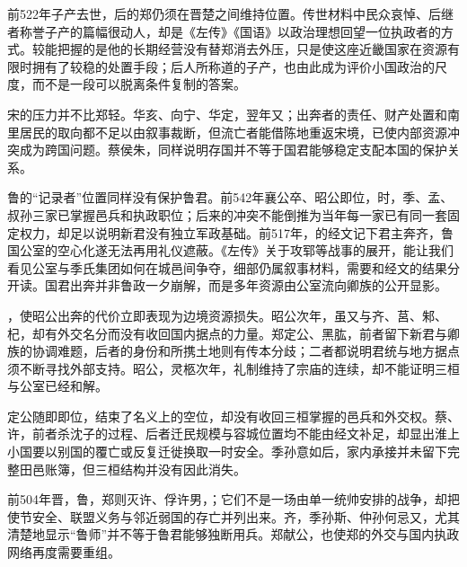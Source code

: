 前522年子产去世，后的郑仍须在晋楚之间维持位置。传世材料中民众哀悼、后继者称誉子产的篇幅很动人，却是《左传》《国语》以政治理想回望一位执政者的方式。较能把握的是他的长期经营没有替郑消去外压，只是使这座近畿国家在资源有限时拥有了较稳的处置手段；后人所称道的子产，也由此成为评价小国政治的尺度，而不是一段可以脱离条件复制的答案。

宋的压力并不比郑轻。华亥、向宁、华定，翌年又；出奔者的责任、财产处置和南里居民的取向都不足以由叙事裁断，但流亡者能借陈地重返宋境，已使内部资源冲突成为跨国问题。蔡侯朱，同样说明存国并不等于国君能够稳定支配本国的保护关系。

鲁的“记录者”位置同样没有保护鲁君。前542年襄公卒、昭公即位，时，季、孟、叔孙三家已掌握邑兵和执政职位；后来的冲突不能倒推为当年每一家已有同一套固定权力，却足以说明新君没有独立军政基础。前517年，的经文记下君主奔齐，鲁国公室的空心化遂无法再用礼仪遮蔽。《左传》关于攻郓等战事的展开，能让我们看见公室与季氏集团如何在城邑间争夺，细部仍属叙事材料，需要和经文的结果分开读。国君出奔并非鲁政一夕崩解，而是多年资源由公室流向卿族的公开显影。

，使昭公出奔的代价立即表现为边境资源损失。昭公次年，虽又与齐、莒、邾、杞，却有外交名分而没有收回国内据点的力量。郑定公、黑肱，前者留下新君与卿族的协调难题，后者的身份和所携土地则有传本分歧；二者都说明君统与地方据点须不断寻找外部支持。昭公，灵柩次年，礼制维持了宗庙的连续，却不能证明三桓与公室已经和解。

定公随即即位，结束了名义上的空位，却没有收回三桓掌握的邑兵和外交权。蔡、许，前者杀沈子的过程、后者迁民规模与容城位置均不能由经文补足，却显出淮上小国要以别国的覆亡或反复迁徙换取一时安全。季孙意如后，家内承接并未留下完整田邑账簿，但三桓结构并没有因此消失。

前504年晋，鲁，郑则灭许、俘许男，；它们不是一场由单一统帅安排的战争，却把使节安全、联盟义务与邻近弱国的存亡并列出来。齐，季孙斯、仲孙何忌又，尤其清楚地显示“鲁师”并不等于鲁君能够独断用兵。郑献公，也使郑的外交与国内执政网络再度需要重组。


